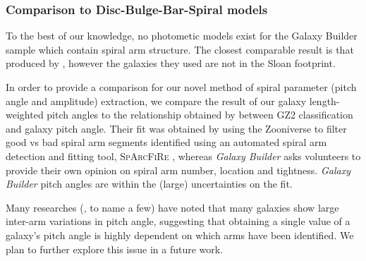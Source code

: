 \documentclass[../main.tex]{subfiles}
\begin{document}
\subsubsection{Comparison to Disc-Bulge-Bar-Spiral models}
To the best of our knowledge, no photometic models exist for the Galaxy Builder sample which contain spiral arm structure. The closest comparable result is that produced by \citet{Gao2017:1709.00746v1}, however the galaxies they used are not in the Sloan footprint.

In order to provide a comparison for our novel method of spiral parameter (pitch angle and amplitude) extraction, we compare the result of our galaxy length-weighted pitch angles to the relationship obtained by \citet{Hart2016:1607.01019v1} between GZ2 classification and galaxy pitch angle. Their fit was obtained by using the Zooniverse to filter good vs bad spiral arm segments identified using an automated spiral arm detection and fitting tool, \textsc{SpArcFiRe} \citep{Davis2014:1402.1910v1}, whereas \textit{Galaxy Builder} asks volunteers to provide their own opinion on spiral arm number, location and tightness. \textit{Galaxy Builder} pitch angles are within the (large) uncertainties on the \citet{Hart2016:1607.01019v1} fit.

Many researches (\citealt{Davis2014:1402.1910v1}, \citealt{2019arXiv190804246D} to name a few) have noted that many galaxies show large inter-arm variations in pitch angle, suggesting that obtaining a single value of a galaxy's pitch angle is highly dependent on which arms have been identified. We plan to further explore this issue in a future work.
\end{document}
